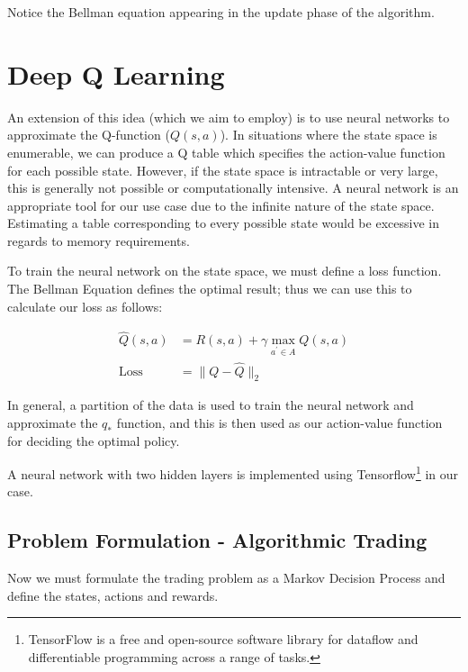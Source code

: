 \documentclass[12pt, authoryear]{elsarticle}
\begin{document}
Notice the Bellman equation appearing in the update phase of the algorithm.

\section{Deep Q Learning}
An extension of this idea (which we aim to employ) is to use neural networks to approximate the Q-function ($Q(s, a)$). In situations where the state space is enumerable, we can produce a Q table which specifies the action-value function for each possible state. However, if the state space is intractable or very large, this is generally not possible or computationally intensive. A neural network is an appropriate tool for our use case due to the infinite nature of the state space. Estimating a table corresponding to every possible state would be excessive in regards to memory requirements.

To train the neural network on the state space, we must define a loss function. The Bellman Equation defines the optimal result; thus we can use this to calculate our loss as follows:

$$
\begin{aligned}
\hat { Q } ( s , a ) &= R ( s , a ) + \gamma \max _ { a ^ { \prime } \in A } Q ( s , a ) \\
\text {Loss} &= \| Q - \hat { Q } \| _ { 2 }
\end{aligned}
$$

In general, a partition of the data is used to train the neural network and approximate the $q_{*}$ function, and this is then used as our action-value function for deciding the optimal policy.

A neural network with two hidden layers is implemented using Tensorflow\footnote{TensorFlow is a free and open-source software library for dataflow and differentiable programming across a range of tasks.} in our case.

\subsection{Problem Formulation - Algorithmic Trading}
Now we must formulate the trading problem as a Markov Decision Process and define the states, actions and rewards.
\end{document}
